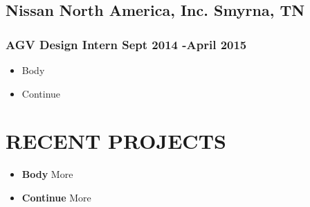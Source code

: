 \documentclass{article}
\newenvironment{mytemize}			%
{
\begin{itemize}[leftmargin=*]			%

	\setlength\itemsep{-0.25em}		%
	
}
{\end{itemize}}
\begin{document}

\vspace{-1.75em}			%

\subsection{\textbf{Nissan North America, Inc.} \hfill Smyrna, TN}

\vspace{-0.4em}
\subsubsection{AGV Design Intern \hfill Sept 2014 -April 2015}

\vspace{-0.25em}
\begin{mytemize}

	\item Body
	\item Continue

\end{mytemize}



\vspace{-1.5em}				%



\section{\color{BrickRed} RECENT PROJECTS}

\vspace{-0.25em}
\begin{mytemize}

	\item \textbf{Body} More
	\item \textbf{Continue} More

\end{mytemize}


\vspace{-1.5em}				%


\end{document}
